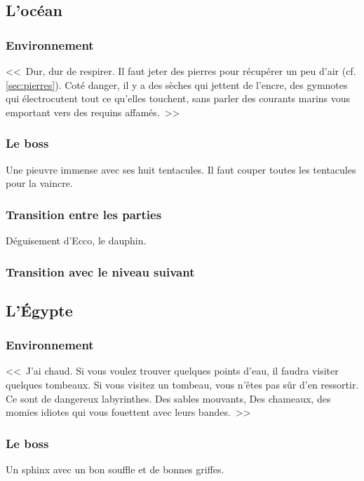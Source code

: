 \documentclass{article}
\begin{document}
\subsection{L'océan}
\subsubsection{Environnement}
<<~Dur, dur de respirer. Il faut jeter des pierres pour récupérer un
peu d'air (cf. \ref{sec:pierres}). Coté danger, il y a des sèches qui
jettent de l'encre, des gymnotes qui électrocutent tout ce qu'elles
touchent, sans parler des courants marins vous emportant vers des
requins affamés.~>>

\subsubsection{Le boss}
Une pieuvre immense avec ses huit tentacules. Il faut couper toutes
les tentacules pour la vaincre.

\subsubsection{Transition entre les parties}
Déguisement d'Ecco, le dauphin.

\subsubsection{Transition avec le niveau suivant}

\subsection{L'Égypte}
\subsubsection{Environnement}
<<~J'ai chaud. Si vous voulez trouver quelques points d'eau, il faudra
visiter quelques tombeaux. Si vous visitez un tombeau, vous n'êtes pas
sûr d'en ressortir. Ce sont de dangereux labyrinthes. Des sables
mouvants, Des chameaux, des momies idiotes qui vous fouettent avec
leurs bandes.~>>

\subsubsection{Le boss}
Un sphinx avec un bon souffle et de bonnes griffes.
\end{document}
